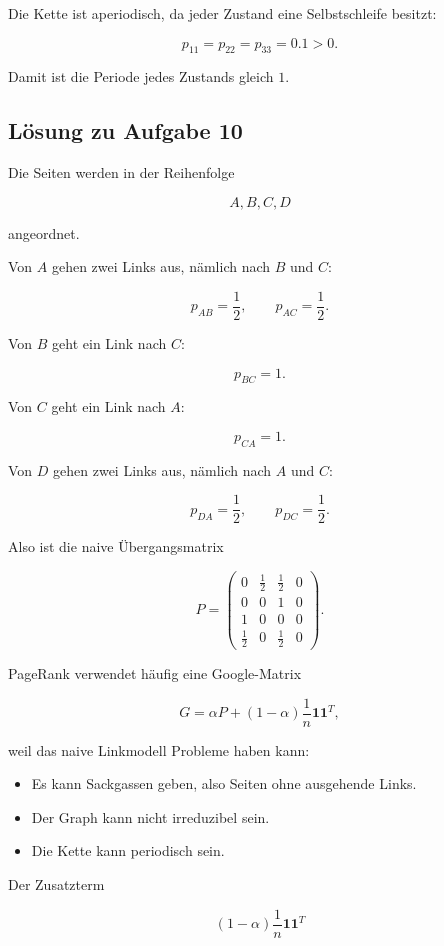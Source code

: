 \documentclass[11pt,a4paper]{article}
\begin{document}
Die Kette ist aperiodisch, da jeder Zustand eine Selbstschleife besitzt:

\[
p_{11}=p_{22}=p_{33}=0.1>0.
\]

Damit ist die Periode jedes Zustands gleich $1$.

\subsection*{Lösung zu Aufgabe 10}

Die Seiten werden in der Reihenfolge

\[
A,B,C,D
\]

angeordnet.

Von $A$ gehen zwei Links aus, nämlich nach $B$ und $C$:

\[
p_{AB}=\frac12,
\qquad
p_{AC}=\frac12.
\]

Von $B$ geht ein Link nach $C$:

\[
p_{BC}=1.
\]

Von $C$ geht ein Link nach $A$:

\[
p_{CA}=1.
\]

Von $D$ gehen zwei Links aus, nämlich nach $A$ und $C$:

\[
p_{DA}=\frac12,
\qquad
p_{DC}=\frac12.
\]

Also ist die naive Übergangsmatrix

\[
P=
\begin{pmatrix}
0 & \frac12 & \frac12 & 0 \\
0 & 0 & 1 & 0 \\
1 & 0 & 0 & 0 \\
\frac12 & 0 & \frac12 & 0
\end{pmatrix}.
\]

PageRank verwendet häufig eine Google-Matrix

\[
G=\alpha P+(1-\alpha)\frac1n\mathbf{1}\mathbf{1}^T,
\]

weil das naive Linkmodell Probleme haben kann:

\begin{itemize}
    \item Es kann Sackgassen geben, also Seiten ohne ausgehende Links.
    \item Der Graph kann nicht irreduzibel sein.
    \item Die Kette kann periodisch sein.
\end{itemize}

Der Zusatzterm

\[
(1-\alpha)\frac1n\mathbf{1}\mathbf{1}^T
\]
\end{document}
